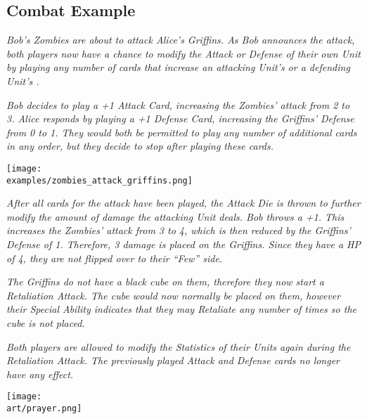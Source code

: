 \clearpage

\subsection*{Combat Example}

\begin{multicols*}{2}
\textit{Bob's Zombies are about to attack Alice's Griffins.
As Bob announces the attack, both players now have a chance to modify the Attack or Defense of their own Unit by playing any number of  cards that increase an attacking Unit's  or a defending Unit's .}\par
\textit{Bob decides to play a +1 Attack Card, increasing the Zombies' attack from 2 to 3.
Alice responds by playing a +1 Defense Card, increasing the Griffins' Defense from 0 to 1.
They would both be permitted to play any number of additional cards in any order, but they decide to stop after playing these cards.}\par

\texttt{[image: \\examples/zombies\_attack\_griffins.png]}

\textit{After all cards for the attack have been played, the Attack Die is thrown to further modify the amount of damage the attacking Unit deals.
Bob throws a +1.
This increases the Zombies' attack from 3 to 4, which is then reduced by the Griffins' Defense of 1. Therefore, 3 damage  is placed on the Griffins. Since they have a HP  of 4, they are not flipped over to their ``Few'' side.}\par
\textit{The Griffins do not have a black cube on them, therefore they now start a Retaliation Attack.
The cube would now normally be placed on them, however their Special  Ability indicates that they may Retaliate any number of times so the cube is not placed.}\par
\textit{Both players are allowed to modify the Statistics of their Units again during the Retaliation Attack.
The previously played Attack and Defense cards no longer have any effect.}

\vfill

{\texttt{[image: \\art/prayer.png]}}

\end{multicols*}

\clearpage

